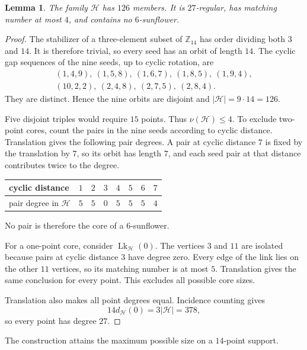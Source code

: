 \documentclass[11pt]{article}
\numberwithin{equation}{section}
\newtheorem{lemma}[lemma]{Lemma}
\theoremstyle{definition}
\theoremstyle{remark}
\newcommand{\Hh}{\mathcal H}
\newcommand{\Lk}{\operatorname{Lk}}
\newcommand{\Z}{\mathbb Z}
\begin{document}
\begin{lemma}
\label{lem:f36-cyclic-family}
The family $\Hh$ has $126$ members. It is $27$-regular, has matching
number at most $4$, and contains no $6$-sunflower.
\end{lemma}

\begin{proof}
The stabilizer of a three-element subset of $\Z_{14}$ has order dividing
both $3$ and $14$. It is therefore trivial, so every seed has an orbit of
length $14$. The cyclic gap sequences of the nine seeds, up to cyclic
rotation, are
\[
\begin{gathered}
 (1,4,9),\ (1,5,8),\ (1,6,7),\ (1,8,5),\ (1,9,4),\\
 (10,2,2),\ (2,4,8),\ (2,7,5),\ (2,8,4).
\end{gathered}
\]
They are distinct. Hence the nine orbits are disjoint and
$|\Hh|=9\cdot14=126$.

Five disjoint triples would require $15$ points. Thus
$\nu(\Hh)\le4$. To exclude two-point cores, count the pairs in the nine
seeds according to cyclic distance. Translation gives the following pair
degrees. A pair at cyclic distance $7$ is fixed by the translation by $7$,
so its orbit has length $7$, and each seed pair at that distance contributes
twice to the degree.
\begin{center}
\begin{tabular}{@{}lrrrrrrr@{}}
\toprule
cyclic distance & $1$ & $2$ & $3$ & $4$ & $5$ & $6$ & $7$\\
\midrule
pair degree in $\Hh$ & $5$ & $5$ & $0$ & $5$ & $5$ & $5$ & $4$\\
\bottomrule
\end{tabular}
\end{center}
No pair is therefore the core of a $6$-sunflower.

For a one-point core, consider $\Lk_{\Hh}(0)$. The vertices $3$ and $11$
are isolated because pairs at cyclic distance $3$ have degree zero. Every
edge of the link lies on the other $11$ vertices, so its matching number is
at most $5$. Translation gives the same conclusion for every point. This
excludes all possible core sizes.

Translation also makes all point degrees equal. Incidence counting gives
\[
 14d_{\Hh}(0)=3|\Hh|=378,
\]
so every point has degree $27$.
\end{proof}

The construction attains the maximum possible size on a $14$-point support.
\end{document}
